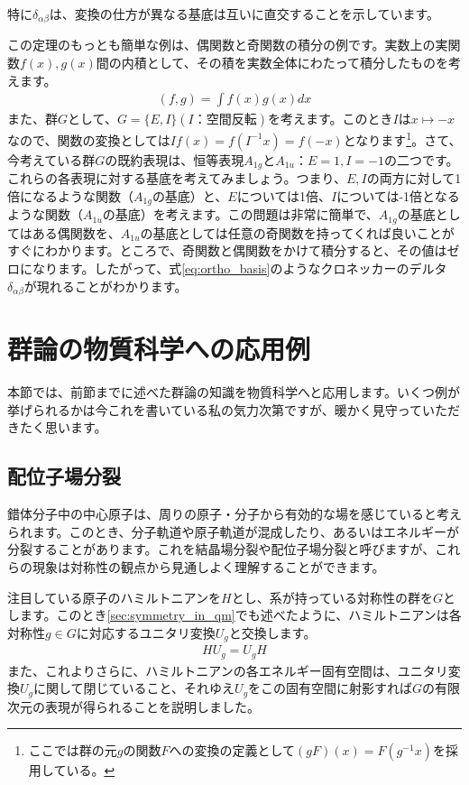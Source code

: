 \documentclass[uplatex,dvipdfmx,a4j]{jsarticle}
\begin{document}
特に$\delta_{\alpha\beta}$は、変換の仕方が異なる基底は互いに直交することを示しています。

この定理のもっとも簡単な例は、偶関数と奇関数の積分の例です。実数上の実関数$f(x),g(x)$間の内積として、その積を実数全体にわたって積分したものを考えます。
\begin{align}
	(f,g) = \int f(x)g(x) dx
\end{align}
また、群$G$として、$G = \{ E, I\} (I：空間反転)$を考えます。このとき$I$は$x\mapsto -x$なので、関数の変換としては$If(x) = f(I^{-1}x)=f(-x)$となります\footnote{ここでは群の元$g$の関数$F$への変換の定義として$(gF)(x) = F(g^{-1}x)$を採用している。}。さて、今考えている群$G$の既約表現は、恒等表現$A_{1g}$と$A_{1u}：E=1, I=-1$の二つです。これらの各表現に対する基底を考えてみましょう。つまり、$E,I$の両方に対して1倍になるような関数（$A_{1g}$の基底）と、$E$については1倍、$I$については-1倍となるような関数（$A_{1u}$の基底）を考えます。この問題は非常に簡単で、$A_{1g}$の基底としてはある偶関数を、$A_{1u}$の基底としては任意の奇関数を持ってくれば良いことがすぐにわかります。ところで、奇関数と偶関数をかけて積分すると、その値はゼロになります。したがって、式\eqref{eq:ortho_basis}のようなクロネッカーのデルタ$\delta_{\alpha\beta}$が現れることがわかります。

\section{群論の物質科学への応用例}
本節では、前節までに述べた群論の知識を物質科学へと応用します。いくつ例が挙げられるかは今これを書いている私の気力次第ですが、暖かく見守っていただきたく思います。

\subsection{配位子場分裂}
錯体分子中の中心原子は、周りの原子・分子から有効的な場を感じていると考えられます。このとき、分子軌道や原子軌道が混成したり、あるいはエネルギーが分裂することがあります。これを結晶場分裂や配位子場分裂と呼びますが、これらの現象は対称性の観点から見通しよく理解することができます。

注目している原子のハミルトニアンを$H$とし、系が持っている対称性の群を$G$とします。このとき\ref{sec:symmetry_in_qm}でも述べたように、ハミルトニアンは各対称性$g \in G$に対応するユニタリ変換$U_g$と交換します。
\begin{align}
	HU_g = U_gH
\end{align}
また、これよりさらに、ハミルトニアンの各エネルギー固有空間は、ユニタリ変換$U_g$に関して閉じていること、それゆえ$U_g$をこの固有空間に射影すれば$G$の有限次元の表現が得られることを説明しました。
\end{document}
